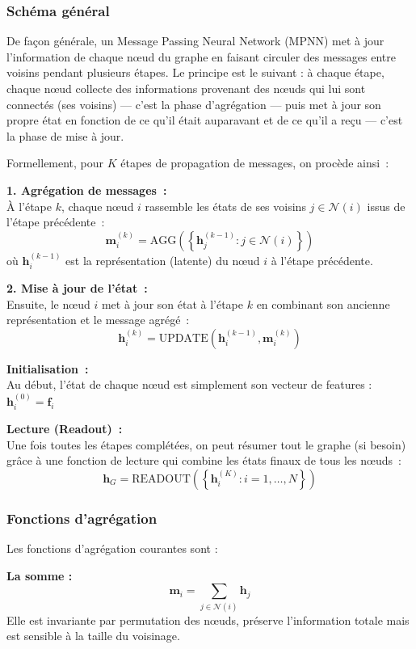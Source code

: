 \subsubsection{Schéma général}

De façon générale, un Message Passing Neural Network (MPNN) met à jour l'information de chaque nœud du graphe en faisant circuler des messages entre voisins pendant plusieurs étapes. Le principe est le suivant : à chaque étape, chaque nœud collecte des informations provenant des nœuds qui lui sont connectés (ses voisins) — c'est la phase d'agrégation — puis met à jour son propre état en fonction de ce qu'il était auparavant et de ce qu'il a reçu — c'est la phase de mise à jour.

Formellement, pour $K$ étapes de propagation de messages, on procède ainsi :

\textbf{1. Agrégation de messages :}\\
À l'étape $k$, chaque nœud $i$ rassemble les états de ses voisins $j \in \mathcal{N}(i)$ issus de l'étape précédente :
\[
\mathbf{m}_i^{(k)} = \text{AGG}\left(\left\{\mathbf{h}_j^{(k-1)} : j \in \mathcal{N}(i)\right\}\right)
\]
où $\mathbf{h}_i^{(k-1)}$ est la représentation (latente) du nœud $i$ à l'étape précédente.

\textbf{2. Mise à jour de l'état :}\\
Ensuite, le nœud $i$ met à jour son état à l'étape $k$ en combinant son ancienne représentation et le message agrégé :
\[
\mathbf{h}_i^{(k)} = \text{UPDATE}\left(\mathbf{h}_i^{(k-1)}, \mathbf{m}_i^{(k)}\right)
\]

\textbf{Initialisation :}\\
Au début, l'état de chaque nœud est simplement son vecteur de features :
$\mathbf{h}_i^{(0)} = \mathbf{f}_i$

\textbf{Lecture (Readout) :}\\
Une fois toutes les étapes complétées, on peut résumer tout le graphe (si besoin) grâce à une fonction de lecture qui combine les états finaux de tous les nœuds :
\[
\mathbf{h}_G = \text{READOUT}\left(\left\{\mathbf{h}_i^{(K)} : i = 1, \ldots, N\right\}\right)
\]

\subsubsection{Fonctions d'agrégation}

Les fonctions d'agrégation courantes sont :

\textbf{La somme :}
\[
\mathbf{m}_i = \sum_{j \in \mathcal{N}(i)} \mathbf{h}_j
\]
Elle est invariante par permutation des nœuds, préserve l'information totale mais est sensible à la taille du voisinage.

